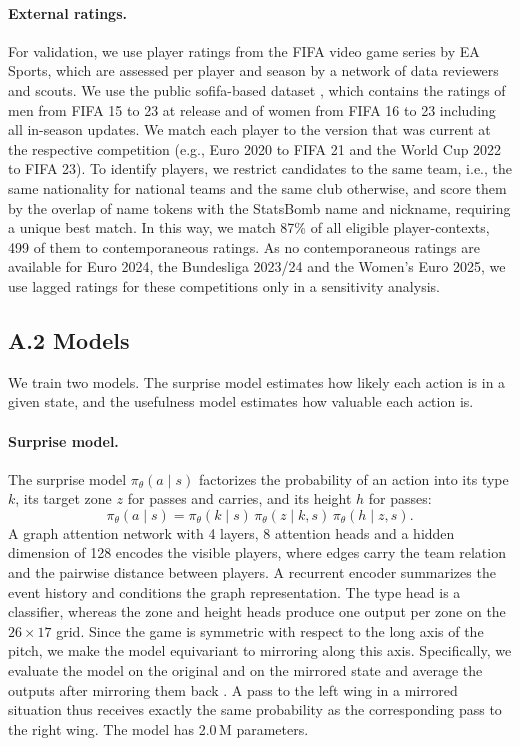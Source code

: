 \paragraph{External ratings.} For validation, we use player ratings from the FIFA video game series by EA Sports,
which are assessed per player and season by a network of data reviewers and scouts. We use the public sofifa-based
dataset \parencite{leone2023fifa}, which contains the ratings of men from FIFA 15 to 23 at release and of women from
FIFA 16 to 23 including all in-season updates. We match each player to the version that was current at the
respective competition (e.g., Euro 2020 to FIFA 21 and the World Cup 2022 to FIFA 23). To identify players, we
restrict candidates to the same team, i.e., the same nationality for national teams and the same club otherwise, and
score them by the overlap of name tokens with the StatsBomb name and nickname, requiring a unique best match. In this
way, we match 87\% of all eligible player-contexts, 499 of them to contemporaneous ratings. As no contemporaneous
ratings are available for Euro 2024, the Bundesliga 2023/24 and the Women's Euro 2025, we use lagged ratings for
these competitions only in a sensitivity analysis.

\subsection*{A.2 Models}

We train two models. The surprise model estimates how likely each action is in a given state, and the usefulness
model estimates how valuable each action is.

\paragraph{Surprise model.} The surprise model $\pi_\theta(a \mid s)$ factorizes the probability of an action into its
type $k$, its target zone $z$ for passes and carries, and its height $h$ for passes:
\begin{equation*}
\pi_\theta(a \mid s) = \pi_\theta(k \mid s)\, \pi_\theta(z \mid k, s)\, \pi_\theta(h \mid z, s).
\end{equation*}
A graph attention network \parencite[GATv2;][]{brody2022attentive} with 4 layers, 8 attention heads and a hidden
dimension of 128 encodes the visible players, where edges carry the team relation and the pairwise distance between
players. A recurrent encoder \parencite[GRU;][]{cho2014learning} summarizes the event history and conditions the graph
representation. The type head is a classifier, whereas the zone and height heads produce one output per zone on the
$26 \times 17$ grid. Since the game is symmetric with respect to the long axis of the pitch, we make the model
equivariant to mirroring along this axis. Specifically, we evaluate the model on the original and on the mirrored
state and average the outputs after mirroring them back \parencite[frame averaging;][]{puny2022frame}. A pass to the
left wing in a mirrored situation thus receives exactly the same probability as the corresponding pass to the right
wing. The model has 2.0\,M parameters.

